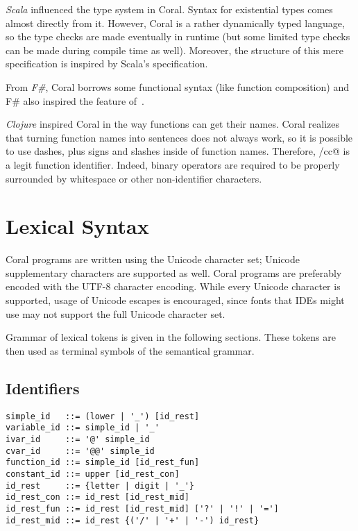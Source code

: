\emph{Scala} influenced the type system in Coral. Syntax for existential types comes almost directly from it. However, Coral is a rather dynamically typed language, so the type checks are made eventually in runtime (but some limited type checks can be made during compile time as well). Moreover, the structure of this mere specification is inspired by Scala's specification. 

From \emph{F\#}, Coral borrows some functional syntax (like function composition) and F\# also inspired the feature of~. 

\emph{Clojure} inspired Coral in the way functions can get their names. Coral realizes that turning function names into sentences does not always work, so it is possible to use dashes, plus signs and slashes inside of function names. Therefore, \lstinline@call/cc@ is a legit function identifier. Indeed, binary operators are required to be properly surrounded by whitespace or other non-identifier characters. 

\chapter{Lexical Syntax}

Coral programs are written using the Unicode character set; Unicode supplementary characters are supported as well. Coral programs are preferably encoded with the UTF-8 character encoding. While every Unicode character is supported, usage of Unicode escapes is encouraged, since fonts that IDEs might use may not support the full Unicode character set.

Grammar of lexical tokens is given in the following sections. These tokens are then used as terminal symbols of the semantical grammar. 

\newpage

\section{Identifiers}\label{sec:identifiers}

\syntax\begin{lstlisting}
simple_id   ::= (lower | '_') [id_rest]
variable_id ::= simple_id | '_'
ivar_id     ::= '@' simple_id
cvar_id     ::= '@@' simple_id
function_id ::= simple_id [id_rest_fun]
constant_id ::= upper [id_rest_con]
id_rest     ::= {letter | digit | '_'}
id_rest_con ::= id_rest [id_rest_mid]
id_rest_fun ::= id_rest [id_rest_mid] ['?' | '!' | '=']
id_rest_mid ::= id_rest {('/' | '+' | '-') id_rest}
\end{lstlisting}


